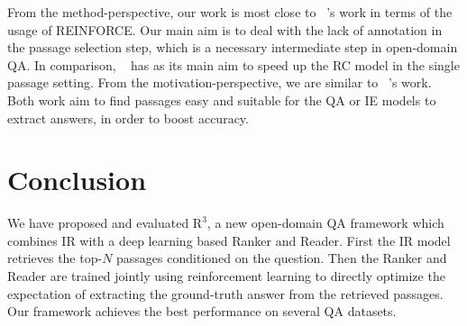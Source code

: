 \documentclass[letterpaper]{article} %
\begin{document}
From the method-perspective, our work is most close to \citeauthor{choi2017coarse}~\citeyear{choi2017coarse}'s work in terms of the usage of REINFORCE. Our main aim is to deal with the lack of annotation in the passage selection step, which is a necessary intermediate step in open-domain QA. In comparison, \citeauthor{choi2017coarse}~\citeyear{choi2017coarse} has as its main aim to speed up the RC model in the single passage setting. 
From the motivation-perspective, we are similar to \citeauthor{narasimhan-yala-barzilay:2016:EMNLP2016}~\citeyear{narasimhan-yala-barzilay:2016:EMNLP2016}'s work. Both work aim to find passages easy and suitable for the QA or IE models to extract answers, in order to boost accuracy.

\section{Conclusion}
We have proposed and evaluated $\text{R}^3$, a new open-domain QA framework which combines IR with a deep learning based Ranker and Reader. First the IR model retrieves the top-$N$ passages conditioned on the question. Then the  Ranker and Reader are trained jointly using reinforcement learning to directly optimize the expectation of extracting the ground-truth answer from the retrieved passages.
Our framework achieves the best performance on several QA datasets. 




\end{document}
